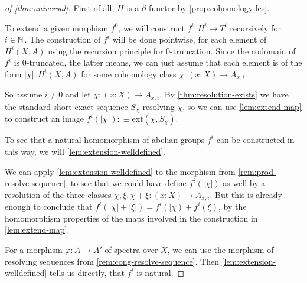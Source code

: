 \begin{proof}[of \cref{thm:universal}]
  First of all, $H$ is a $\partial$-functor by \cref{prop:cohomology-les}.

  To extend a given morphism $f^0$, 
  we will construct $f^i:H^i\to T^i$ recursively for $i\in\mathbb{N}$.
  The construction of $f^i$ will be done pointwise, for each element of $H^i(X,A)$ using the recursion principle for 0-truncation.
  Since the codomain of $f^i$ is 0-truncated, the latter means, we can just assume that each element is of the form $|\chi|:H^i(X,A)$
  for some cohomology class $\chi:(x:X)\to A_{x,i}$.

  So assume $i\neq 0$ and let $\chi:(x:X)\to A_{x,i}$.
  By \cref{thm:resolution-exists} we have the standard short exact sequence $S_\chi$ resolving $\chi$,
  so we can use \cref{lem:extend-map} to construct an image $f^i(|\chi|):\equiv \mathrm{ext}(\chi,S_\chi)$.
  
  To see that a natural homomorphism of abelian groups $f^i$ can be constructed in this way,
  we will \cref{lem:extension-welldefined}.

  We can apply \cref{lem:extension-welldefined} to the morphism from \cref{rem:prod-resolve-sequence},
  to see that we could have define $f^i(|\chi|)$ as well by
  a resolution of the three classes $\chi, \xi, \chi+\xi:(x:X)\to A_{x,i}$.
  But this is already enough to conclude that $f^i(|\chi|+|\xi|)=f^i(|\chi)+f^i(\xi)$, by the homomorphism properties of the maps involved in the construction in \cref{lem:extend-map}.

  For a morphism $\varphi:A\to A'$ of spectra over $X$,
  we can use the morphism of resolving sequences from \cref{rem:cong-resolve-sequence}.
  Then \cref{lem:extension-welldefined} tells us directly, that $f^i$ is natural.
  

\end{proof}
